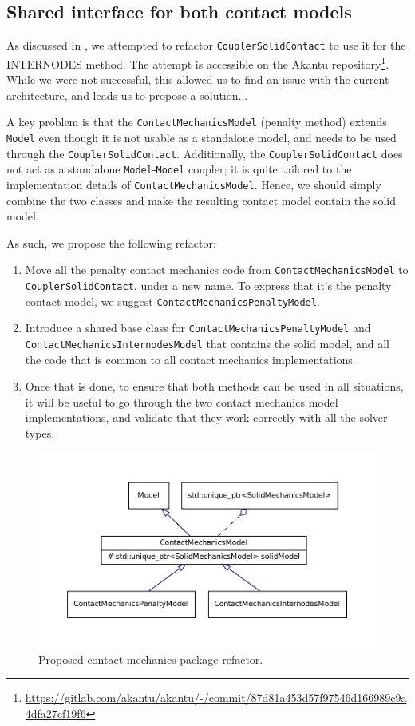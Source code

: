 \documentclass[11pt, a4paper]{article}
\begin{document}
\subsection{Shared interface for both contact models}
\label{subsec:coupler}

As discussed in , we attempted to refactor \texttt{CouplerSolidContact} to use it for the INTERNODES method. The attempt is accessible on the Akantu repository\footnote{\url{https://gitlab.com/akantu/akantu/-/commit/87d81a453d57f97546d166989c9a4dfa27cf19f6}}. While we were not successful, this allowed us to find an issue with the current architecture, and leads us to propose a solution...

A key problem is that the \texttt{ContactMechanicsModel} (penalty method) extends \texttt{Model} even though it is not usable as a standalone model, and needs to be used through the \texttt{CouplerSolidContact}. Additionally, the \texttt{CouplerSolidContact} does not act as a standalone \texttt{Model}-\texttt{Model} coupler; it is quite tailored to the implementation details of \texttt{ContactMechanicsModel}. Hence, we should simply combine the two classes and make the resulting contact model contain the solid model.

As such, we propose the following refactor:
\begin{enumerate}
    \item Move all the penalty contact mechanics code from \texttt{ContactMechanicsModel} to \texttt{CouplerSolidContact}, under a new name. To express that it's the penalty contact model, we suggest \texttt{ContactMechanicsPenaltyModel}.
    \item Introduce a shared base class for \texttt{ContactMechanicsPenaltyModel} and \texttt{ContactMechanicsInternodesModel} that contains the solid model, and all the code that is common to all contact mechanics implementations.
    \item Once that is done, to ensure that both methods can be used in all situations, it will be useful to go through the two contact mechanics model implementations, and validate that they work correctly with all the solver types.
\end{enumerate}

\begin{figure}[!htb]
    \centering
    \includegraphics[width=1.0\linewidth]{diagrams/contact_refactor.pdf}
    \caption{Proposed contact mechanics package refactor.}
    \label{fig:contact_refactor}
\end{figure}
\end{document}
